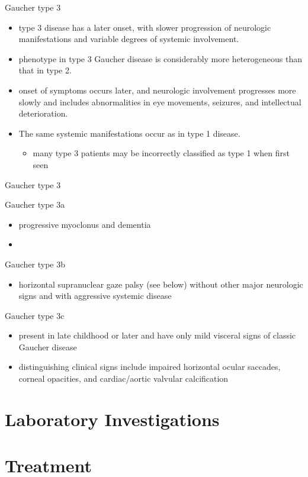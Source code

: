 \documentclass[presentation, smaller]{beamer}
\begin{document}
\begin{frame}[label={sec:orgheadline12}]{Gaucher type 3}
\begin{itemize}
\item type 3 disease has a later onset, with slower progression of
neurologic manifestations and variable degrees of systemic
involvement.
\item phenotype in type 3 Gaucher disease is considerably more
heterogeneous than that in type 2.

\item onset of symptoms occurs later, and neurologic involvement
progresses more slowly and includes abnormalities in eye movements,
seizures, and intellectual deterioration.

\item The same systemic manifestations occur as in type 1 disease.

\begin{itemize}
\item many type 3 patients may be incorrectly classified as type 1 when
first seen
\end{itemize}
\end{itemize}
\end{frame}

\begin{frame}[label={sec:orgheadline13}]{Gaucher type 3}
\begin{block}{Gaucher type 3a}
\begin{itemize}
\item progressive myoclonus and dementia
\item 
\end{itemize}
\end{block}

\begin{block}{Gaucher type 3b}
\begin{itemize}
\item horizontal supranuclear gaze palsy (see below) without other major
neurologic signs and with aggressive systemic disease
\end{itemize}
\end{block}

\begin{block}{Gaucher type 3c}
\begin{itemize}
\item present in late childhood or later and have only mild visceral signs
of classic Gaucher disease
\item distinguishing clinical signs include impaired horizontal ocular
saccades, corneal opacities, and cardiac/aortic valvular
calcification
\end{itemize}
\end{block}
\end{frame}
\section{Laboratory Investigations}
\label{sec:orgheadline15}

\section{Treatment}
\label{sec:orgheadline16}
\end{document}
